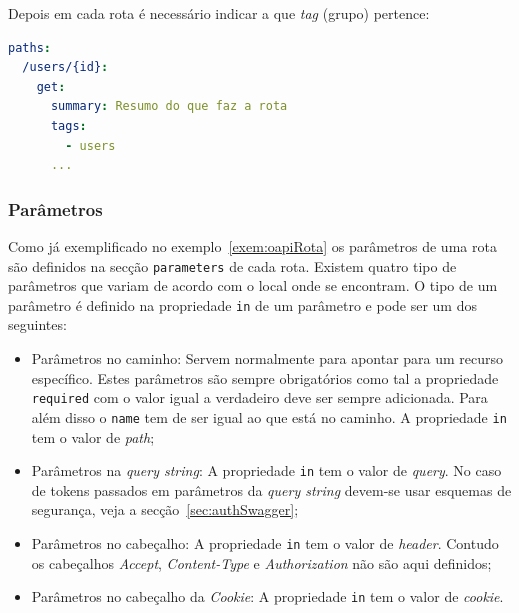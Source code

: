 Depois em cada rota é necessário indicar a que \textit{tag} (grupo) pertence:
\begin{lstlisting}[language=yaml, caption=Exemplo de uso de \textit{tags} numa rota na especificação \textit{OpenAPI}]
paths:
  /users/{id}:
    get:
      summary: Resumo do que faz a rota
      tags:
        - users
      ...
\end{lstlisting}

\vspace{-0.7cm}

\subsubsection{Parâmetros}\label{sec:paramSwagger}
Como já exemplificado no exemplo~\ref{exem:oapiRota} os parâmetros de uma rota são definidos na 
secção \texttt{parameters} de cada rota. 
Existem quatro tipo de parâmetros que variam de acordo com o local onde se encontram. 
O tipo de um parâmetro é definido na propriedade \texttt{in} de um parâmetro e pode ser um dos seguintes:
\begin{itemize}
    \item Parâmetros no caminho: Servem normalmente para apontar para um recurso específico. 
    Estes parâmetros são sempre obrigatórios como tal a propriedade \texttt{required} com o valor igual a 
    verdadeiro deve ser sempre adicionada. Para além disso o \texttt{name} tem de ser igual ao que está no 
    caminho. A propriedade \texttt{in} tem o valor de \textit{path};
    \item Parâmetros na \textit{query string}: A propriedade \texttt{in} tem o valor de \textit{query}. 
    No caso de tokens passados em parâmetros da \textit{query string} devem-se usar esquemas de segurança, 
    veja a secção~\ref{sec:authSwagger};
    \item Parâmetros no cabeçalho: A propriedade \texttt{in} tem o valor de \textit{header}. 
    Contudo os cabeçalhos \textit{Accept}, \textit{Content-Type} e \textit{Authorization} não são aqui definidos;
    \item Parâmetros no cabeçalho da \textit{Cookie}: A propriedade \texttt{in} tem o valor de \textit{cookie}.
\end{itemize}

